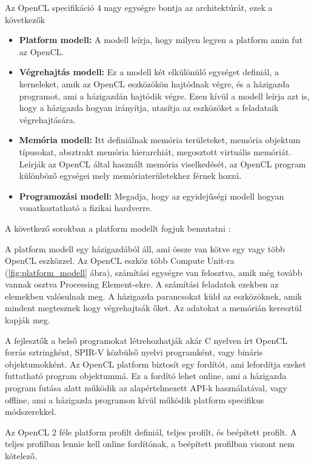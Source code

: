 Az OpenCL specifikáció 4 nagy egységre bontja az architektúrát, ezek a következők \cite{spec_archi}
\begin{itemize}
\item \textbf{Platform modell:} A modell leírja, hogy milyen legyen a platform amin fut az OpenCL. 
\item \textbf{Végrehajtás modell:} Ez a modell két elkülönülő egységet definiál, a kerneleket, amik az OpenCL eszközökön hajtódnak végre, és a házigazda programot, ami a házigazdán hajtódik végre. Ezen kívül a modell leírja azt is, hogy a házigazda hogyan irányítja, utasítja az eszközöket a feladataik végrehajtására.
\item \textbf{Memória modell:} Itt definiálnak memória területeket,  memória objektum típusokat, absztrakt memória hierarchiát, megosztott virtuális memóriát. Leírják az OpenCL által használt memória viselkedését, az OpenCL program különböző egységei mely memóriaterületekhez férnek hozzá.
\item \textbf{Programozási modell:} Megadja, hogy az egyidejűségi modell hogyan vonatkoztatható a fizikai hardverre.

\end{itemize}

A következő sorokban a platform modellt fogjuk bemutatni \cite{spec_platform} :

A platform modell egy házigazdából áll, ami össze van kötve egy vagy több OpenCL eszközzel. Az OpenCL eszköz több Compute Unit-ra (\ref{fig:platform_modell} ábra), számítási egységre van felosztva, amik még tovább vannak osztva Processing Element-ekre. A számítási feladatok ezekben az elemekben valósulnak meg. A házigazda parancsokat küld az eszközöknek, amik mindent megtesznek hogy végrehajtsák őket. Az adatokat a memórián keresztül kapják meg. 

A fejlesztők a belső programokat létrehozhatják akár C nyelven írt OpenCL forrás sztringként, SPIR-V közbülső nyelvi programként, vagy bináris objektumokként. Az OpenCL platform biztosít egy fordítót, ami lefordítja ezeket futtatható program objektummá. Ez a fordító lehet online, ami a házigazda program futása alatt működik az alapértelmezett API-k használatával, vagy offline, ami a házigazda programon kívül működik platform specifikus módszerekkel.

Az OpenCL 2 féle platform profilt definiál, teljes profilt, és beépített profilt. A teljes profilban lennie kell online fordítónak, a beépített profilban viszont nem kötelező.

